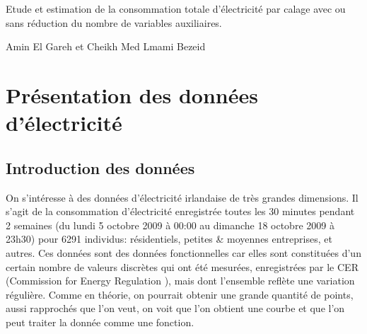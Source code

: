 \documentclass[11pt,fleqn]{book} %
\begin{document}
\let\cleardoublepage\clearpage


\begingroup
\thispagestyle{empty}

\centering
\vspace*{9cm}
\par\normalfont\fontsize{35}{35}\sffamily\selectfont
Etude et estimation de la consommation totale d'électricité par calage avec ou sans réduction du nombre de variables auxiliaires.\par %
\vspace*{1cm}
{\Huge Amin El Gareh et Cheikh Med Lmami Bezeid}\par %
\endgroup





\renewcommand\contentsname{Table des Matières}
\tableofcontents





\chapter{Présentation des données d'électricité}

\section{Introduction des données}

On s’intéresse à des données d'électricité irlandaise de très grandes dimensions. Il s'agit de la consommation d'électricité enregistrée toutes les 30 minutes pendant 2 semaines (du lundi 5 octobre 2009 à 00:00 au dimanche 18 octobre 2009 à 23h30) pour 6291 individus: résidentiels, petites \& moyennes entreprises, et autres.
Ces données sont des données fonctionnelles car elles sont constituées d’un certain nombre de valeurs discrètes qui ont été mesurées, enregistrées par le CER (Commission for Energy Regulation ), mais dont l’ensemble reflète une variation régulière. Comme en théorie, on pourrait obtenir une grande quantité de points, aussi rapprochés que l’on veut, on voit que l’on obtient une courbe et que l’on peut traiter la donnée comme une fonction.
\end{document}
